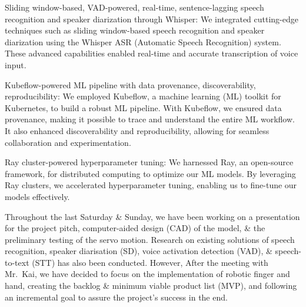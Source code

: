 Sliding window-based, VAD-powered, real-time, sentence-lagging speech recognition and speaker diarization through Whisper: We integrated cutting-edge techniques such as sliding window-based speech recognition and speaker diarization using the Whisper ASR (Automatic Speech Recognition) system. These advanced capabilities enabled real-time and accurate transcription of voice input.

Kubeflow-powered ML pipeline with data provenance, discoverability, reproducibility: We employed Kubeflow, a machine learning (ML) toolkit for Kubernetes, to build a robust ML pipeline. With Kubeflow, we ensured data provenance, making it possible to trace and understand the entire ML workflow. It also enhanced discoverability and reproducibility, allowing for seamless collaboration and experimentation.

Ray cluster-powered hyperparameter tuning: We harnessed Ray, an open-source framework, for distributed computing to optimize our ML models. By leveraging Ray clusters, we accelerated hyperparameter tuning, enabling us to fine-tune our models effectively.

\newpage


Throughout the last Saturday \& Sunday, we have been working on a presentation for the project pitch, computer-aided design (CAD) of the model, \& the preliminary testing of the servo motion. Research on existing solutions of speech recognition, speaker diarisation (SD), voice activation detection (VAD), \& speech-to-text (STT) has also been conducted. However, After the meeting with Mr.~Kai, we have decided to focus on the implementation of robotic finger and hand, creating the backlog \& minimum viable product list (MVP), and following an incremental goal to assure the project's success in the end.

\newpage